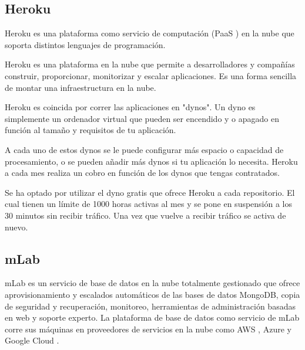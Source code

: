 


\subsection{ Heroku }

Heroku es una plataforma como servicio de computación (PaaS \cite{URL::PaaS}) en la nube que soporta distintos lenguajes de programación.

Heroku es una plataforma en la nube que permite a desarrolladores y compañías construir, proporcionar, monitorizar y escalar aplicaciones. Es una forma sencilla de montar una infraestructura en la nube.

Heroku es coincida por correr las aplicaciones en "dynos". Un dyno es simplemente un ordenador virtual que pueden ser encendido y o apagado en función al tamaño y requisitos de tu aplicación.

A cada uno de estos dynos se le puede configurar más espacio o capacidad de procesamiento, o se pueden añadir más dynos si tu aplicación lo necesita. Heroku a cada mes realiza un cobro en función de los dynos que tengas contratados. 

Se ha optado por utilizar el dyno gratis que ofrece Heroku a cada repositorio. El cual tienen un límite de 1000 horas activas al mes y se pone en suspensión a los 30 minutos sin recibir tráfico. Una vez que vuelve a recibir tráfico se activa de nuevo.    



\subsection{ mLab }

mLab es un servicio de base de datos en la nube totalmente gestionado que ofrece aprovisionamiento y escalados automáticos de las bases de datos MongoDB, copia de seguridad y recuperación, monitoreo, herramientas de administración basadas en web y soporte experto. La plataforma de base de datos como servicio de mLab corre sus máquinas en proveedores de servicios en la nube como AWS \cite{URL::aws}, Azure \cite{URL::Azure} y Google Cloud \cite{URL::GoogleCloud}.

